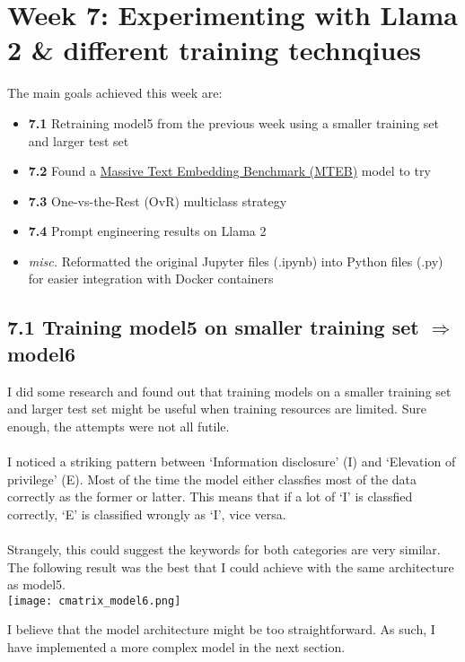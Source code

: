 \section*{Week 7: Experimenting with Llama 2 \& different training technqiues}

The main goals achieved this week are:
\begin{itemize}[topsep=0pt]
    \item \textbf{7.1} Retraining model5 from the previous week using a smaller training set and larger test set
    \item \textbf{7.2} Found a \href{https://arxiv.org/pdf/2210.07316.pdf}{Massive Text Embedding Benchmark (MTEB)} model to try
    \item \textbf{7.3} One-vs-the-Rest (OvR) multiclass strategy
    \item \textbf{7.4} Prompt engineering results on Llama 2
    \item \textit{misc.} Reformatted the original Jupyter files (.ipynb) into Python files (.py) for easier integration with Docker containers
\end{itemize}

\subsection*{7.1 Training model5 on smaller training set $\Longrightarrow$ model6}
I did some research and found out that training models on a smaller training set and larger test set might be useful when training resources are limited.
Sure enough, the attempts were not all futile. \\\\
I noticed a striking pattern between `Information disclosure' (I) and `Elevation of privilege' (E). Most of the time the model either classfies most of the data correctly as the former or latter. This means that if a lot of `I' is classfied correctly, `E' is classified wrongly as `I', vice versa. \\\\
Strangely, this could suggest the keywords for both categories are very similar. The following result was the best that I could achieve with the same architecture as model5. \\

\texttt{[image: cmatrix\_model6.png]}

I believe that the model architecture might be too straightforward. As such, I have implemented a more complex model in the next section.

